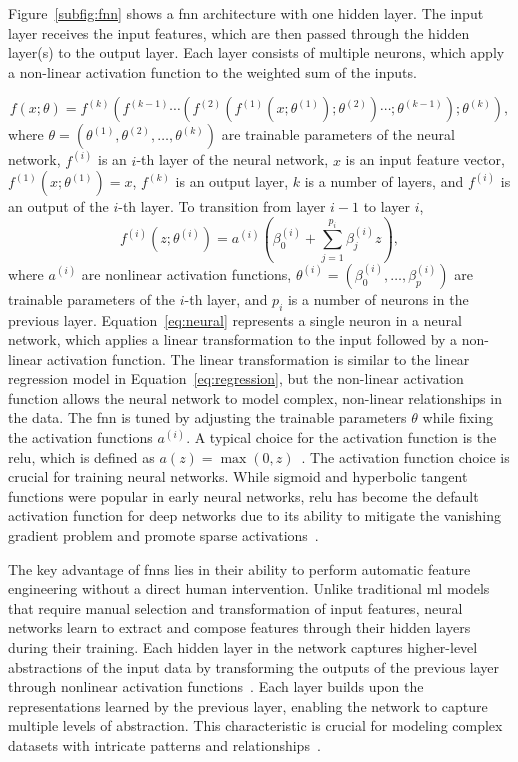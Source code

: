 Figure~\ref{subfig:fnn} shows a \gls{fnn} architecture with one hidden layer.
The input layer receives the input features, which are then passed through the hidden layer(s) to the output layer.
Each layer consists of multiple neurons, which apply a non-linear activation function to the weighted sum of the inputs.

\begin{equation} \label{eq:fnn}
    f(x; \theta) = f^{(k)}(f^{(k-1)} \cdots (f^{(2)}(f^{(1)}(x;\theta^{(1)});\theta^{(2)} )\cdots ;\theta^{(k-1)});\theta^{(k)}),
\end{equation}
where $\theta = (\theta^{(1)}, \theta^{(2)}, \ldots, \theta^{(k)})$ are trainable parameters of the neural network, $f^{(i)}$ is an $i$-th layer of the neural network, $x$ is an input feature vector, $f^{(1)}(x;\theta^{(1)}) = x$, $f^{(k)}$ is an output layer, $k$ is a number of layers, and $f^{(i)}$ is an output of the $i$-th layer.
To transition from layer $i-1$ to layer $i$,
\begin{equation} \label{eq:neural}
    f^{(i)}(z;\theta^{(i)}) = a^{(i)}(\beta_0^{(i)} + \sum_{j=1}^{p_i} \beta_j^{(i)} z),
\end{equation}
where $a^{(i)}$ are nonlinear activation functions, $\theta^{(i)} = (\beta_0^{(i)}, \dots, \beta_p^{(i)})$ are trainable parameters of the $i$-th layer, and $p_i$ is a number of neurons in the previous layer.
Equation~\eqref{eq:neural} represents a single neuron in a neural network, which applies a linear transformation to the input followed by a non-linear activation function.
The linear transformation is similar to the linear regression model in Equation~\eqref{eq:regression}, but the non-linear activation function allows the neural network to model complex, non-linear relationships in the data.
The \gls{fnn} is tuned by adjusting the trainable parameters $\theta$ while fixing the activation functions $a^{(i)}$.
A typical choice for the activation function is the \gls{relu}, which is defined as $a(z) = \max(0, z)$~\citep{nair2010rectified}.
The activation function choice is crucial for training neural networks.
While sigmoid and hyperbolic tangent functions were popular in early neural networks, \gls{relu} has become the default activation function for deep networks due to its ability to mitigate the vanishing gradient problem and promote sparse activations~\citep{lecun2015deep}.

The key advantage of \gls{fnn}s lies in their ability to perform automatic feature engineering without a direct human intervention.
Unlike traditional \gls{ml} models that require manual selection and transformation of input features, neural networks learn to extract and compose features through their hidden layers during their training.
Each hidden layer in the network captures higher-level abstractions of the input data by transforming the outputs of the previous layer through nonlinear activation functions~\citep{lecun2015deep}.
Each layer builds upon the representations learned by the previous layer, enabling the network to capture multiple levels of abstraction.
This characteristic is crucial for modeling complex datasets with intricate patterns and relationships~\citep{bengio2013representation}.

